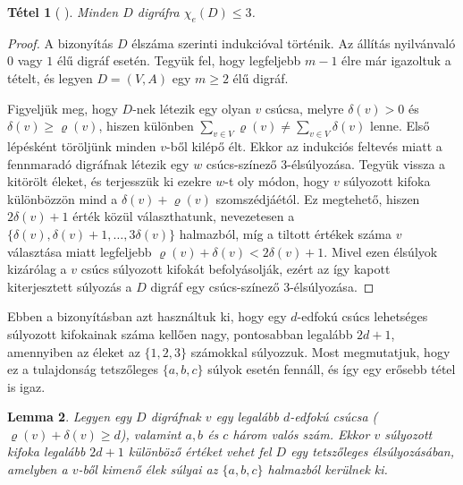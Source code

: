 \documentclass[12pt, a4paper]{report}
\newtheorem{tét}{Tétel}[section]
\newtheorem{lem}[tét]{Lemma}
\theoremstyle{remark}
\theoremstyle{definition}
\begin{document}
\begin{tét}[\citeauthor{Baudon2014} \cite{Baudon2014}]
Minden $D$ digráfra $\chi_e(D) \leq 3$.
\end{tét}

\begin{proof}
A bizonyítás $D$ élszáma szerinti indukcióval történik. Az állítás nyilvánvaló $0$ vagy $1$ élű digráf esetén. Tegyük fel, hogy legfeljebb $m - 1$ élre már igazoltuk a tételt, és legyen $D = (V, A)$ egy $m \geq 2$ élű digráf.

Figyeljük meg, hogy $D$-nek létezik egy olyan $v$ csúcsa, melyre $\delta(v) > 0$ és $\delta(v) \geq \varrho(v)$, hiszen különben $\sum\limits_{v \in V} \varrho(v) \neq \sum\limits_{v \in V} \delta(v)$ lenne. Első lépésként töröljünk minden $v$-ből kilépő élt. Ekkor az indukciós feltevés miatt a fennmaradó digráfnak létezik egy $w$ csúcs-színező 3-élsúlyozása. Tegyük vissza a kitörölt éleket, és terjesszük ki ezekre $w$-t oly módon, hogy $v$ súlyozott kifoka különbözzön mind a $\delta(v) + \varrho(v)$ szomszédjáétól. Ez megtehető, hiszen $2\delta(v) + 1$ érték közül választhatunk, nevezetesen a $\lbrace \delta(v), \delta(v) + 1, \ldots, 3\delta(v) \rbrace$ halmazból, míg a tiltott értékek száma $v$ választása miatt legfeljebb $\varrho(v) + \delta(v) < 2\delta(v) + 1$. Mivel ezen élsúlyok kizárólag a $v$ csúcs súlyozott kifokát befolyásolják, ezért az így kapott kiterjesztett súlyozás a $D$ digráf egy csúcs-színező 3-élsúlyozása.
\end{proof}

Ebben a bizonyításban azt használtuk ki, hogy egy $d$-edfokú csúcs lehetséges súlyozott kifokainak száma kellően nagy, pontosabban legalább $2d + 1$, amennyiben az éleket az $\lbrace 1, 2, 3 \rbrace$ számokkal súlyozzuk. Most megmutatjuk, hogy ez a tulajdonság tetszőleges $\lbrace a, b, c \rbrace$ súlyok esetén fennáll, és így egy erősebb tétel is igaz.

\begin{lem}
Legyen egy $D$ digráfnak $v$ egy legalább $d$-edfokú csúcsa ($\varrho(v) + \delta(v) \geq d$), valamint $a, b$ és $c$ három valós szám. Ekkor $v$ súlyozott kifoka legalább $2d + 1$ különböző értéket vehet fel $D$ egy tetszőleges élsúlyozásában, amelyben a $v$-ből kimenő élek súlyai az $\lbrace a, b, c \rbrace$ halmazból kerülnek ki.
\end{lem}
\end{document}

